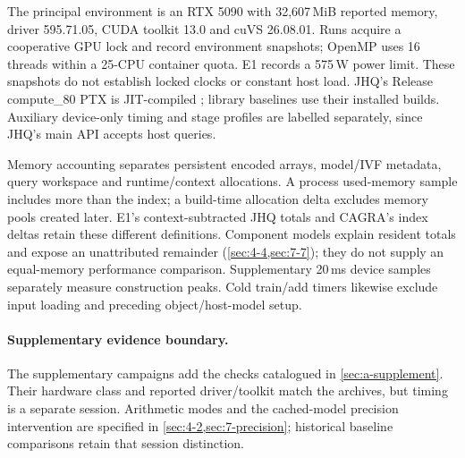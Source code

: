 The principal environment is an RTX 5090 with 32,607\,MiB reported memory,
driver 595.71.05, CUDA toolkit 13.0 and cuVS 26.08.01. Runs acquire a
cooperative GPU lock and record environment snapshots; OpenMP uses 16
threads within a 25-CPU container quota. E1 records a 575\,W power limit.
These snapshots do not establish locked clocks or constant host load.
JHQ's Release compute\_80 PTX is JIT-compiled \cite{cuda_platform}; library baselines use their
installed builds. Auxiliary device-only timing and stage profiles are
labelled separately, since JHQ's main API accepts host queries.

Memory accounting separates persistent encoded arrays, model/IVF metadata,
query workspace and runtime/context allocations. A process used-memory
sample includes more than the index; a build-time allocation delta excludes
memory pools created later. E1's context-subtracted JHQ totals and CAGRA's
index deltas retain these different definitions. Component models explain
resident totals and expose an unattributed remainder
(\cref{sec:4-4,sec:7-7}); they do not supply an equal-memory performance comparison.
Supplementary 20\,ms device samples separately measure construction peaks. Cold train/add timers likewise
exclude input loading and preceding object/host-model setup.

\paragraph{Supplementary evidence boundary.}
The supplementary campaigns add the checks catalogued in
\cref{sec:a-supplement}. Their hardware class and reported driver/toolkit
match the archives, but timing is a separate session. Arithmetic modes
and the cached-model precision intervention are specified in
\cref{sec:4-2,sec:7-precision}; historical baseline comparisons retain
that session distinction.
